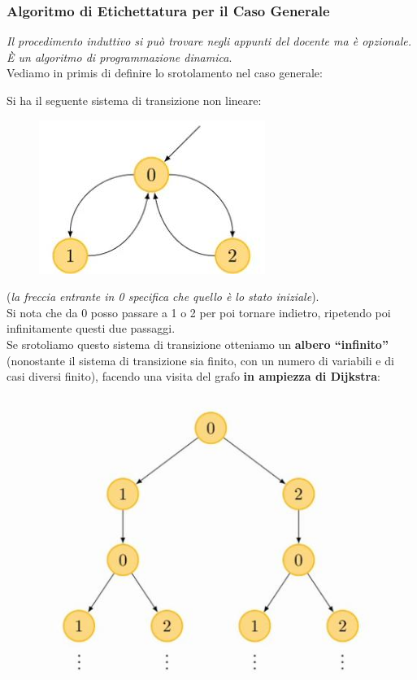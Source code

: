 \documentclass[a4paper,12pt, oneside]{book}
\begin{document}
\subsubsection{Algoritmo di Etichettatura per il Caso Generale}
\textit{Il procedimento induttivo si può trovare negli appunti del docente ma è
  opzionale. È un algoritmo di programmazione dinamica}.\\
Vediamo in primis di definire lo srotolamento nel caso generale:
\begin{definizione}
  Si ha il seguente sistema di transizione non lineare:
  \begin{figure}[H]
    \centering
    \includegraphics[scale = 0.5]{img/nl.jpg} 
  \end{figure}
  (\textit{la freccia entrante in 0 specifica che quello è lo stato
    iniziale}).\\
  Si nota che da 0 posso passare a 1 o 2 per poi tornare indietro, ripetendo poi
  infinitamente questi due passaggi.\\
  Se srotoliamo questo sistema di transizione otteniamo un \textbf{albero
    ``infinito''} (nonostante il sistema di transizione sia finito, con un
  numero di variabili e di casi diversi finito), facendo una
  visita del grafo \textbf{in ampiezza di Dijkstra}:  
  \begin{figure}[H]
    \centering
    \includegraphics[scale = 0.5]{img/nl2.jpg} 

\end{figure}
\end{definizione}
\end{document}
